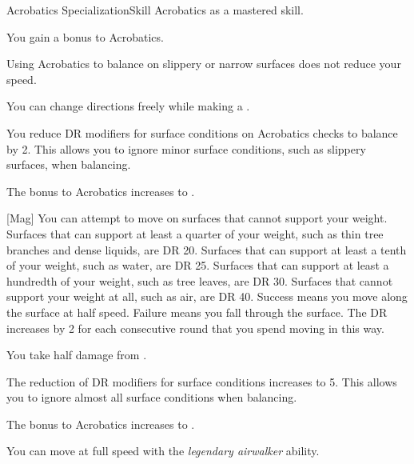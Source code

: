     \begin{feat}{Acrobatics Specialization}{Skill}
        \featpre Acrobatics as a mastered skill.
        
         You gain a  bonus to Acrobatics.

         Using Acrobatics to balance on slippery or narrow surfaces does not reduce your speed.

         You can change directions freely while making a .

         You reduce DR modifiers for surface conditions on Acrobatics checks to balance by 2.
        This allows you to ignore minor surface conditions, such as slippery surfaces, when balancing.

         The bonus to Acrobatics increases to .

        [Mag] You can attempt to move on surfaces that cannot support your weight.
        Surfaces that can support at least a quarter of your weight, such as thin tree branches and dense liquids, are DR 20.
        Surfaces that can support at least a tenth of your weight, such as water, are DR 25.
        Surfaces that can support at least a hundredth of your weight, such as tree leaves, are DR 30.
        Surfaces that cannot support your weight at all, such as air, are DR 40.
        Success means you move along the surface at half speed.
        Failure means you fall through the surface.
        The DR increases by 2 for each consecutive round that you spend moving in this way.

         You take half damage from .

         The reduction of DR modifiers for surface conditions increases to 5.
        This allows you to ignore almost all surface conditions when balancing.

         The bonus to Acrobatics increases to .

         You can move at full speed with the \textit{legendary airwalker} ability.
    \end{feat}

